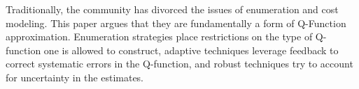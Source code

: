 Traditionally, the community has divorced the issues of enumeration and cost modeling. This paper argues that they are fundamentally a form of Q-Function approximation. Enumeration strategies place restrictions on the type of Q-function one is allowed to construct, adaptive techniques leverage feedback to correct systematic errors in the Q-function, and robust techniques try to account for uncertainty in the estimates.





